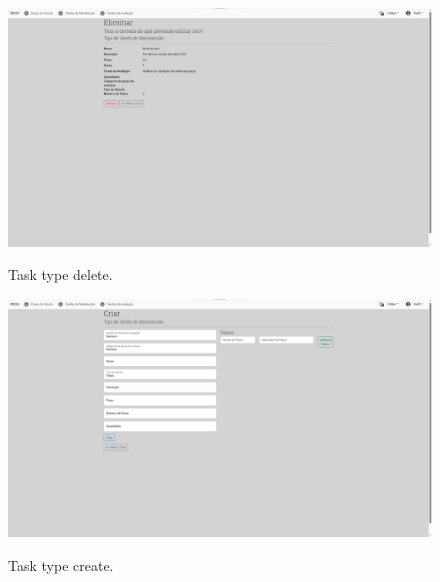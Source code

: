 \begin{figure}[h]
  \caption{Task type delete.}
  \centering
  \includegraphics[width=\textwidth]{figs/Implementation/dealershipAdmin/taskDelete}
  \label{fig:figure2}
\end{figure}

\begin{figure}[h]
  \caption{Task type create.}
  \centering
  \includegraphics[width=\textwidth]{figs/Implementation/dealershipAdmin/taskCreate}
  \label{fig:figure2}
\end{figure}



